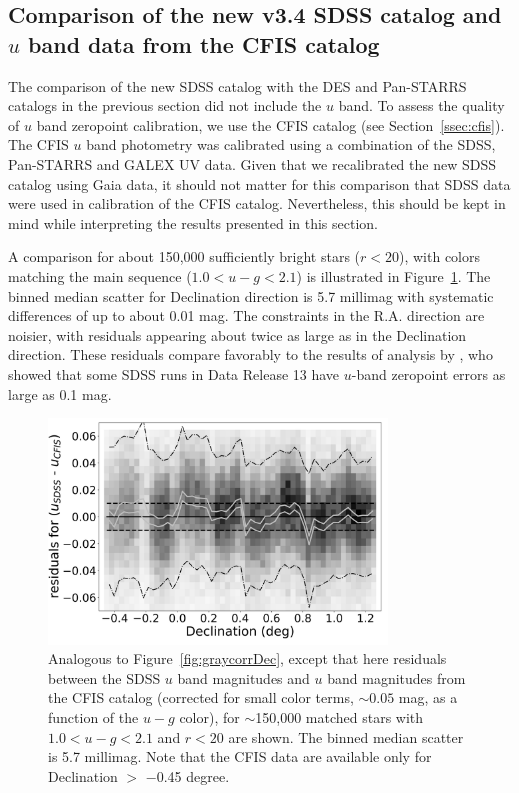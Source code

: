 \documentclass[fleqn,usenatbib]{mnras}
\begin{document}
\subsection{Comparison of the new v3.4 SDSS catalog and $u$ band data from the CFIS catalog  \label{sec:CFIStest}} 

The comparison of the new SDSS catalog with the DES and Pan-STARRS catalogs in the previous
section did not include the $u$ band. To assess the quality of $u$ band zeropoint calibration, 
we use the CFIS catalog (see Section~\ref{ssec:cfis}). The CFIS $u$ band photometry was 
calibrated using a combination of the SDSS, Pan-STARRS and GALEX UV data. Given that
we recalibrated the new SDSS catalog using Gaia data, it should not matter for this comparison that SDSS data were used in calibration of the CFIS catalog. Nevertheless, this should be kept in mind while interpreting the results presented in this section.

A comparison for about 150,000 sufficiently bright stars ($r<20$), with colors matching the main sequence ($1.0 <u-g < 2.1$)  is illustrated in Figure~\ref{fig:CFIS}. The binned median scatter for Declination direction is 
5.7 millimag with systematic differences of up to about 0.01 mag. The constraints in the R.A. direction 
are noisier, with residuals appearing about twice as large as in the Declination direction. 
These residuals compare favorably to the results of analysis by \cite{2017ApJ...848..128I}, 
who showed that some SDSS runs in Data Release 13 have $u$-band zeropoint errors as large
as 0.1 mag. 

 
\begin{figure}[th!]
    \centering\includegraphics[width=9cm]{figures/colorResidCFISug_Dec_Hess.png} 
\caption{Analogous to Figure~\ref{fig:graycorrDec}, except that here residuals 
between the SDSS $u$ band magnitudes and $u$ band magnitudes from the CFIS
catalog (corrected for small color terms, $\sim0.05$ mag, as a function of the $u-g$ color),
for $\sim$150,000 matched stars with $1.0 <u-g < 2.1$ and $r<20$ are shown. 
The binned median scatter is 5.7 millimag. Note that the CFIS data are available
only for Declination $>$ $-$0.45 degree.}
\label{fig:CFIS}
\end{figure}
\end{document}

